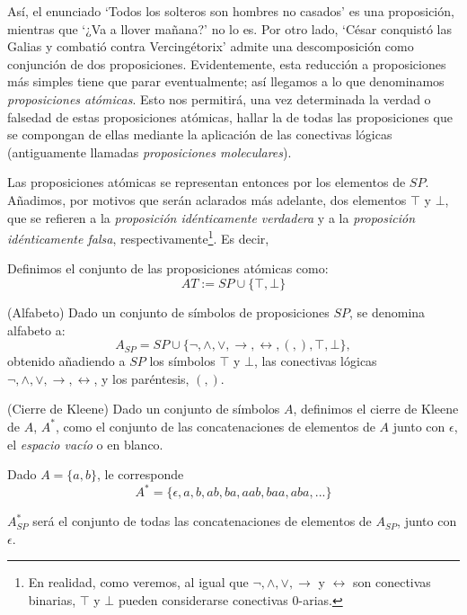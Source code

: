 Así, el enunciado `Todos los solteros son hombres no casados' es una proposición, mientras que `¿Va a llover mañana?' no lo es. Por otro lado, `César conquistó las Galias y combatió contra Vercingétorix' admite una descomposición como conjunción de dos proposiciones. Evidentemente, esta reducción a proposiciones más simples tiene que parar eventualmente; así llegamos a lo que denominamos \textit{proposiciones atómicas}. Esto nos permitirá, una vez determinada la verdad o falsedad de estas proposiciones atómicas, hallar la de todas las proposiciones que se compongan de ellas mediante la aplicación de las conectivas lógicas (antiguamente llamadas \textit{proposiciones moleculares}). \

Las proposiciones atómicas se representan entonces por los elementos de $SP$. Añadimos, por motivos que serán aclarados más adelante, dos elementos $\top$ y $\bot$, que se refieren a la \textit{proposición idénticamente verdadera} y a la \textit{proposición idénticamente falsa}, respectivamente\footnote{En realidad, como veremos, al igual que $\neg,\land,\lor,\to$ y $\leftrightarrow$ son conectivas binarias, $\top$ y $\bot$ pueden considerarse conectivas 0-arias.}. Es decir, 

\begin{definition}\label{def : at}

     Definimos el conjunto de las proposiciones atómicas como:
    \[
        AT := SP\cup \{\top, \bot\}
    \]
\end{definition}


\begin{definition}(Alfabeto)
    Dado un conjunto de símbolos de proposiciones $SP$, se denomina alfabeto a:
    \[
        A_{SP} = SP\cup\{\neg, \land, \lor, \rightarrow, \leftrightarrow, (, ),\top, \bot\},
    \]
    obtenido añadiendo a $SP$ los símbolos $\top$ y $\bot$, las conectivas lógicas $\neg, \land, \lor, \rightarrow, \leftrightarrow$, y los paréntesis, $(,)$.
\end{definition}    


\begin{definition}\label{klee}(Cierre de Kleene)
    Dado un conjunto de símbolos $A$, definimos el cierre de Kleene de $A$, $A^*$, como el conjunto de las concatenaciones de elementos de $A$ junto con $\epsilon$, el \textit{espacio vacío} o en blanco.
\end{definition}

\begin{example} Dado $A = \{a, b\}$, le corresponde 
\[
    A^* = \{\epsilon, a, b, ab, ba, aab, baa, aba, ...\}
\]
\end{example}
\begin{example}
    $A_{SP}^*$ será el conjunto de todas las concatenaciones de elementos de $A_{SP}$, junto con $\epsilon$.
\end{example}

